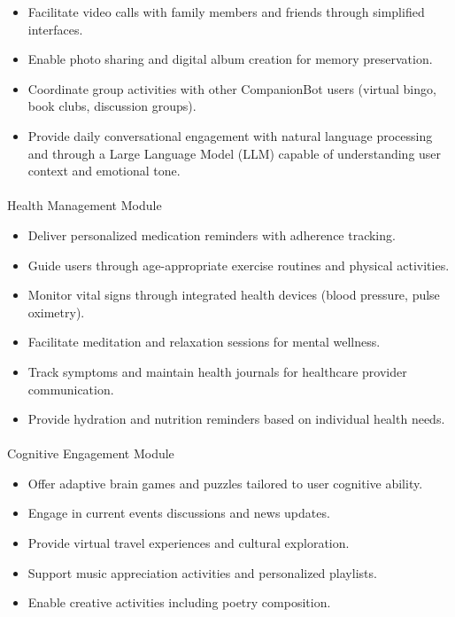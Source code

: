 \documentclass[
  letterpaper,
  DIV=11,
  numbers=noendperiod]{scrartcl}
\makeatletter
\let\oldparagraph\paragraph
\renewcommand{\paragraph}{
    \@ifstar
      \xxxParagraphStar
      \xxxParagraphNoStar
  }
\newcommand{\xxxParagraphStar}[1]{\oldparagraph*{#1}\mbox{}}
\newcommand{\xxxParagraphNoStar}[1]{\oldparagraph{#1}\mbox{}}
\providecommand{\tightlist}{%
  \setlength{\itemsep}{0pt}\setlength{\parskip}{0pt}}\usepackage{longtable,booktabs,array}
\makeatother
\begin{document}
\begin{itemize}
\tightlist
\item
  Facilitate video calls with family members and friends through
  simplified interfaces.
\item
  Enable photo sharing and digital album creation for memory
  preservation.
\item
  Coordinate group activities with other CompanionBot users (virtual
  bingo, book clubs, discussion groups).
\item
  Provide daily conversational engagement with natural language
  processing and through a Large Language Model (LLM) capable of
  understanding user context and emotional tone.
\end{itemize}

\paragraph{Health Management Module}\label{health-management-module}

\begin{itemize}
\tightlist
\item
  Deliver personalized medication reminders with adherence tracking.
\item
  Guide users through age-appropriate exercise routines and physical
  activities.
\item
  Monitor vital signs through integrated health devices (blood pressure,
  pulse oximetry).
\item
  Facilitate meditation and relaxation sessions for mental wellness.
\item
  Track symptoms and maintain health journals for healthcare provider
  communication.
\item
  Provide hydration and nutrition reminders based on individual health
  needs.
\end{itemize}

\paragraph{Cognitive Engagement
Module}\label{cognitive-engagement-module}

\begin{itemize}
\tightlist
\item
  Offer adaptive brain games and puzzles tailored to user cognitive
  ability.
\item
  Engage in current events discussions and news updates.
\item
  Provide virtual travel experiences and cultural exploration.
\item
  Support music appreciation activities and personalized playlists.
\item
  Enable creative activities including poetry composition.
\end{itemize}
\end{document}
